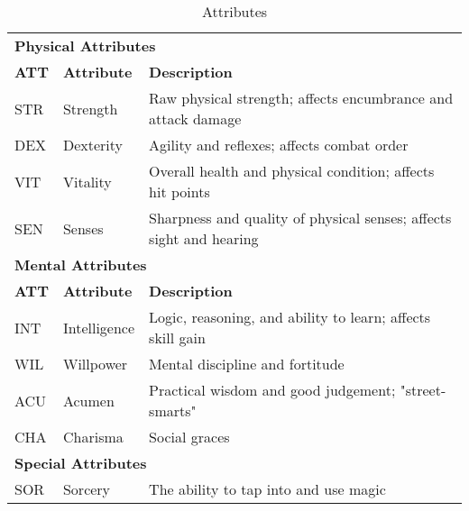 \begin{table}[b!]
    \unclassedrowcolors
    \begin{tabular*}{\textwidth}{l l l}
        \multicolumn{3}{l}{\textbf{Physical Attributes}} \\
        \textbf{ATT} & \textbf{Attribute} & \textbf{Description} \\
        STR & Strength & Raw physical strength; affects encumbrance and attack damage \\
        DEX & Dexterity & Agility and reflexes; affects combat order \\
        VIT & Vitality & Overall health and physical condition; affects hit points \\
        SEN & Senses & Sharpness and quality of physical senses; affects sight and hearing \\
        \multicolumn{3}{l}{\bfseries{Mental Attributes}} \\
        \textbf{ATT} & \textbf{Attribute} & \textbf{Description} \\
        INT & Intelligence & Logic, reasoning, and ability to learn; affects skill gain \\
        WIL & Willpower & Mental discipline and fortitude \\
        ACU & Acumen & Practical wisdom and good judgement; "street-smarts" \\
        CHA & Charisma & Social graces \\
        \multicolumn{3}{l}{\textbf{Special Attributes}} \\
        SOR & Sorcery & The ability to tap into and use magic \\
    \end{tabular*}
    \caption{Attributes}
    \label{tab:attributes}
\end{table}
